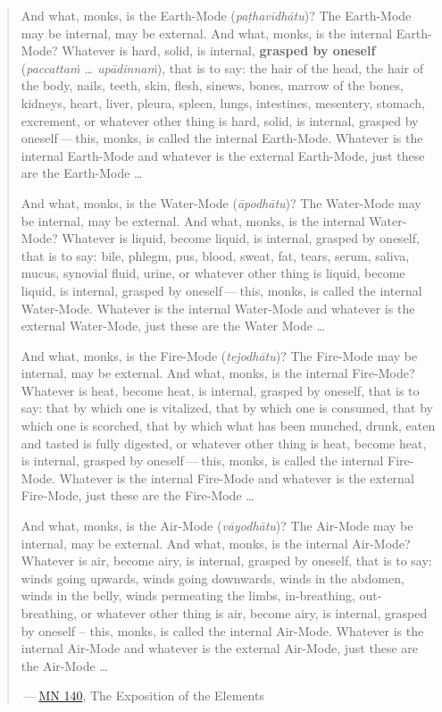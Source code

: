 \begin{quote}
And what, monks, is the Earth-Mode (\emph{paṭhavīdhātu})? The Earth-Mode may be internal, may be external. And what, monks, is the internal Earth-Mode? Whatever is hard, solid, is internal, \textbf{grasped by oneself} (\emph{paccattaṁ \ldots{} upādinnaṁ}), that is to say: the hair of the head, the hair of the body, nails, teeth, skin, flesh, sinews, bones, marrow of the bones, kidneys, heart, liver, pleura, spleen, lungs, intestines, mesentery, stomach, excrement, or whatever other thing is hard, solid, is internal, grasped by oneself --- this, monks, is called the internal Earth-Mode. Whatever is the internal Earth-Mode and whatever is the external Earth-Mode, just these are the Earth-Mode \ldots{}

And what, monks, is the Water-Mode (\emph{āpodhātu})? The Water-Mode may be internal, may be external. And what, monks, is the internal Water-Mode? Whatever is liquid, become liquid, is internal, grasped by oneself, that is to say: bile, phlegm, pus, blood, sweat, fat, tears, serum, saliva, mucus, synovial fluid, urine, or whatever other thing is liquid, become liquid, is internal, grasped by oneself --- this, monks, is called the internal Water-Mode. Whatever is the internal Water-Mode and whatever is the external Water-Mode, just these are the Water Mode \ldots{}

And what, monks, is the Fire-Mode (\emph{tejodhātu})? The Fire-Mode may be internal, may be external. And what, monks, is the internal Fire-Mode? Whatever is heat, become heat, is internal, grasped by oneself, that is to say: that by which one is vitalized, that by which one is consumed, that by which one is scorched, that by which what has been munched, drunk, eaten and tasted is fully digested, or whatever other thing is heat, become heat, is internal, grasped by oneself --- this, monks, is called the internal Fire-Mode. Whatever is the internal Fire-Mode and whatever is the external Fire-Mode, just these are the Fire-Mode \ldots{}

And what, monks, is the Air-Mode (\emph{vāyodhātu})? The Air-Mode may be internal, may be external. And what, monks, is the internal Air-Mode? Whatever is air, become airy, is internal, grasped by oneself, that is to say: winds going upwards, winds going downwards, winds in the abdomen, winds in the belly, winds permeating the limbs, in-breathing, out-breathing, or whatever other thing is air, become airy, is internal, grasped by oneself -- this, monks, is called the internal Air-Mode. Whatever is the internal Air-Mode and whatever is the external Air-Mode, just these are the Air-Mode \ldots{}

 --- \href{https://suttacentral.net/mn140/en/bodhi}{MN 140}, The Exposition of the Elements
\end{quote}

